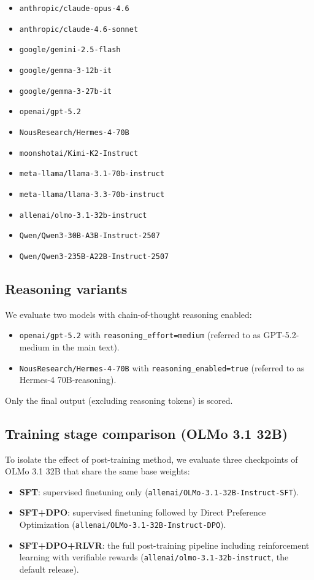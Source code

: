 \begin{itemize}
  \item \texttt{anthropic/claude-opus-4.6}
  \item \texttt{anthropic/claude-4.6-sonnet}
  \item \texttt{google/gemini-2.5-flash}
  \item \texttt{google/gemma-3-12b-it}
  \item \texttt{google/gemma-3-27b-it}
  \item \texttt{openai/gpt-5.2}
  \item \texttt{NousResearch/Hermes-4-70B}
  \item \texttt{moonshotai/Kimi-K2-Instruct}
  \item \texttt{meta-llama/llama-3.1-70b-instruct}
  \item \texttt{meta-llama/llama-3.3-70b-instruct}
  \item \texttt{allenai/olmo-3.1-32b-instruct}
  \item \texttt{Qwen/Qwen3-30B-A3B-Instruct-2507}
  \item \texttt{Qwen/Qwen3-235B-A22B-Instruct-2507}
\end{itemize}

\subsection{Reasoning variants}
We evaluate two models with chain-of-thought reasoning enabled:

\begin{itemize}
  \item \texttt{openai/gpt-5.2} with \texttt{reasoning\_effort=medium} (referred to as GPT-5.2-medium in the main text).
  \item \texttt{NousResearch/Hermes-4-70B} with \texttt{reasoning\_enabled=true} (referred to as Hermes-4 70B-reasoning).
\end{itemize}

Only the final output (excluding reasoning tokens) is scored.

\subsection{Training stage comparison (OLMo 3.1 32B)}

To isolate the effect of post-training method, we evaluate three checkpoints of OLMo 3.1 32B that share the same base weights:

\begin{itemize}
  \item \textbf{SFT}: supervised finetuning only (\texttt{allenai/OLMo-3.1-32B-Instruct-SFT}).
  \item \textbf{SFT+DPO}: supervised finetuning followed by Direct Preference Optimization (\texttt{allenai/OLMo-3.1-32B-Instruct-DPO}).
  \item \textbf{SFT+DPO+RLVR}: the full post-training pipeline including reinforcement learning with verifiable rewards (\texttt{allenai/olmo-3.1-32b-instruct}, the default release).
\end{itemize}

